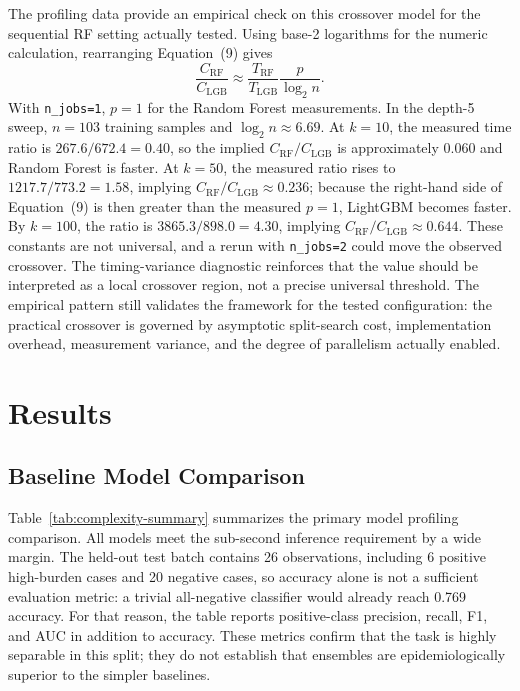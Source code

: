 \documentclass[11pt]{article}
\begin{document}
The profiling data provide an empirical check on this crossover model for the sequential RF setting actually tested. Using base-2 logarithms for the numeric calculation, rearranging Equation~(9) gives
\begin{equation}
\frac{C_{\mathrm{RF}}}{C_{\mathrm{LGB}}} \approx \frac{T_{\mathrm{RF}}}{T_{\mathrm{LGB}}}\frac{p}{\log_2 n}.
\end{equation}
With \texttt{n\_jobs=1}, $p=1$ for the Random Forest measurements. In the depth-5 sweep, $n=103$ training samples and $\log_2 n \approx 6.69$. At $k=10$, the measured time ratio is $267.6/672.4=0.40$, so the implied $C_{\mathrm{RF}}/C_{\mathrm{LGB}}$ is approximately $0.060$ and Random Forest is faster. At $k=50$, the measured ratio rises to $1217.7/773.2=1.58$, implying $C_{\mathrm{RF}}/C_{\mathrm{LGB}} \approx 0.236$; because the right-hand side of Equation~(9) is then greater than the measured $p=1$, LightGBM becomes faster. By $k=100$, the ratio is $3865.3/898.0=4.30$, implying $C_{\mathrm{RF}}/C_{\mathrm{LGB}} \approx 0.644$. These constants are not universal, and a rerun with \texttt{n\_jobs=2} could move the observed crossover. The timing-variance diagnostic reinforces that the value should be interpreted as a local crossover region, not a precise universal threshold. The empirical pattern still validates the framework for the tested configuration: the practical crossover is governed by asymptotic split-search cost, implementation overhead, measurement variance, and the degree of parallelism actually enabled.

\section{Results}
\subsection{Baseline Model Comparison}
Table~\ref{tab:complexity-summary} summarizes the primary model profiling comparison. All models meet the sub-second inference requirement by a wide margin. The held-out test batch contains 26 observations, including 6 positive high-burden cases and 20 negative cases, so accuracy alone is not a sufficient evaluation metric: a trivial all-negative classifier would already reach 0.769 accuracy. For that reason, the table reports positive-class precision, recall, F1, and AUC in addition to accuracy. These metrics confirm that the task is highly separable in this split; they do not establish that ensembles are epidemiologically superior to the simpler baselines.
\end{document}
